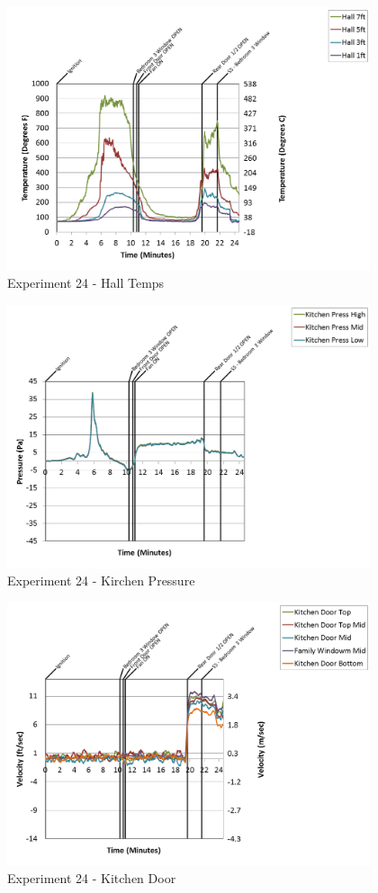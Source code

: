\documentclass{article}
\begin{document}
\begin{appendices}
\clearpage

\begin{figure}[h!]
	\centering
	\includegraphics[height=3.05in]{0_Images/Results_Charts/Exp_24_Charts/HallTemps.png}
	\caption{Experiment 24 - Hall Temps}
\end{figure}


\begin{figure}[h!]
	\centering
	\includegraphics[height=3.05in]{0_Images/Results_Charts/Exp_24_Charts/KirchenPressure.png}
	\caption{Experiment 24 - Kirchen Pressure}
\end{figure}

\clearpage

\begin{figure}[h!]
	\centering
	\includegraphics[height=3.05in]{0_Images/Results_Charts/Exp_24_Charts/KitchenDoor.png}
	\caption{Experiment 24 - Kitchen Door}
\end{figure}



\end{appendices}
\end{document}
